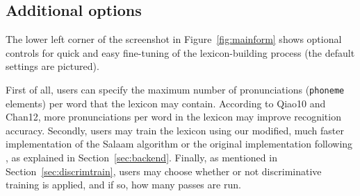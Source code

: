 \documentclass[11pt]{article}
\begin{document}



\subsection{Additional options}
\label{sec:options}

The lower left corner of the screenshot in Figure~\ref{fig:mainform} shows 
optional controls for quick and easy fine-tuning of the lexicon-building process (the default settings are pictured).

First of all, users
can specify the maximum number of pronunciations (\texttt{phoneme} elements) per word that the lexicon may contain. According to 
\newcite
{Qiao10} and 
\newcite
{Chan12}, 
more pronunciations per word in the lexicon may 
improve recognition accuracy.
Secondly, users may train the lexicon using our modified, much faster implementation of the Salaam algorithm or the original implementation 
following , as explained in Section~\ref{sec:backend}.
Finally, as mentioned in Section~\ref{sec:discrimtrain}, users may choose whether or not discriminative training 
is applied, and if so, how many passes are run.

\end{document}
